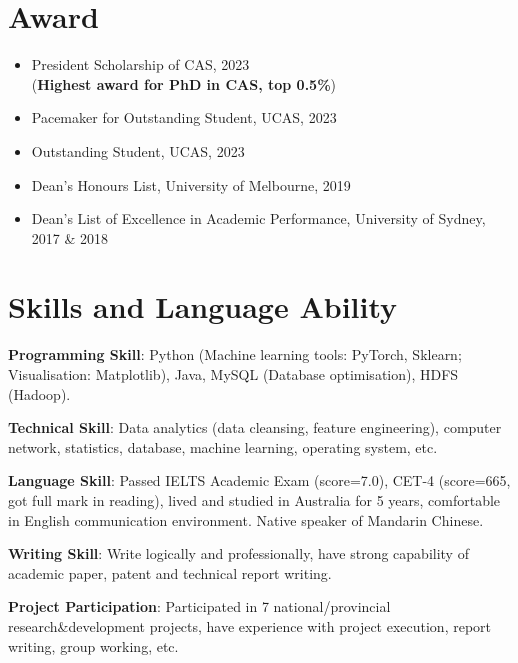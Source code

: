 \documentclass[letterpaper,10.9pt]{article}
\begin{document}

\section{\textbf{Award}}
\vspace{-5mm}
\begin{multicols}{2}
\begin{itemize}
  \setlength\itemsep{2.0pt}
  \item President Scholarship of CAS, 2023\\(\textbf{Highest award for PhD in CAS, top 0.5\%})
  \item Pacemaker for Outstanding Student, UCAS, 2023
  \item Outstanding Student, UCAS, 2023
  \item Dean's Honours List, University of Melbourne, 2019
  \item Dean's List of Excellence in Academic Performance, University of Sydney, 2017 \& 2018
\end{itemize}
\end{multicols}




\section{\textbf{Skills and Language Ability}}
\textbf{Programming Skill}: Python (Machine learning tools: PyTorch, Sklearn; Visualisation: Matplotlib), Java, MySQL (Database optimisation), HDFS (Hadoop). 

\vspace{2mm}

\textbf{Technical Skill}: Data analytics (data cleansing, feature engineering), computer network, statistics, database, machine learning, operating system, etc. 

\vspace{2mm}

\textbf{Language Skill}: Passed IELTS Academic Exam (score=7.0), CET-4 (score=665, got full mark in reading), lived and studied in Australia for 5 years, comfortable in English communication environment. Native speaker of Mandarin Chinese. 

\vspace{2mm}

\textbf{Writing Skill}: Write logically and professionally, have strong capability of academic paper, patent and technical report writing. 

\vspace{2mm}

\textbf{Project Participation}: Participated in 7 national/provincial research\&development projects, have experience with project execution, report writing, group working, etc. 
\end{document}
